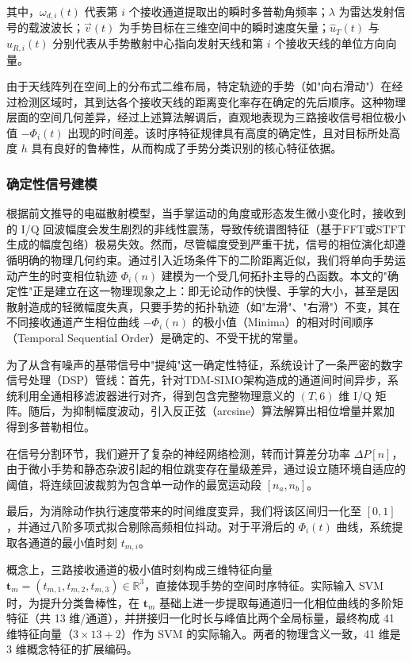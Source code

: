 其中，$\omega_{d,i}(t)$ 代表第 $i$ 个接收通道提取出的瞬时多普勒角频率；$\lambda$ 为雷达发射信号的载波波长；$\vec{v}(t)$ 为手势目标在三维空间中的瞬时速度矢量；$\hat{u}_{T}(t)$ 与 $\hat{u}_{R,i}(t)$ 分别代表从手势散射中心指向发射天线和第 $i$ 个接收天线的单位方向向量。

由于天线阵列在空间上的分布式二维布局，特定轨迹的手势（如"向右滑动"）在经过检测区域时，其到达各个接收天线的距离变化率存在确定的先后顺序。这种物理层面的空间几何差异，经过上述算法解调后，直观地表现为三路接收信号相位极小值 $-\Phi_{i}(t)$ 出现的时间差。该时序特征规律具有高度的确定性，且对目标所处高度 $h$ 具有良好的鲁棒性，从而构成了手势分类识别的核心特征依据。

\subsubsection{确定性信号建模}

根据前文推导的电磁散射模型，当手掌运动的角度或形态发生微小变化时，接收到的 I/Q 回波幅度会发生剧烈的非线性震荡，导致传统谱图特征（基于FFT或STFT生成的幅度包络）极易失效。然而，尽管幅度受到严重干扰，信号的相位演化却遵循明确的物理几何约束。通过引入近场条件下的二阶距离近似，我们将单向手势运动产生的时变相位轨迹 $\Phi_{i}(n)$ 建模为一个受几何拓扑主导的凸函数。本文的"确定性"正是建立在这一物理现象之上：即无论动作的快慢、手掌的大小，甚至是因散射造成的轻微幅度失真，只要手势的拓扑轨迹（如"左滑"、"右滑"）不变，其在不同接收通道产生相位曲线 $-\Phi_{i}(n)$ 的极小值（Minima）的相对时间顺序（Temporal Sequential Order）是确定的、不受干扰的常量\cite{lien2016soli}。

为了从含有噪声的基带信号中"提纯"这一确定性特征，系统设计了一条严密的数字信号处理（DSP）管线：首先，针对TDM-SIMO架构造成的通道间时间异步，系统利用全通相移滤波器进行对齐，得到包含完整物理意义的 $(T, 6)$ 维 I/Q 矩阵。随后，为抑制幅度波动，引入反正弦（arcsine）算法解算出相位增量并累加得到多普勒相位。

在信号分割环节，我们避开了复杂的神经网络检测，转而计算差分功率 $\Delta P[n]$，由于微小手势和静态杂波引起的相位跳变存在量级差异，通过设立随环境自适应的阈值，将连续回波裁剪为包含单一动作的最宽运动段 $[n_{a}, n_{b}]$。

最后，为消除动作执行速度带来的时间维度变异，我们将该区间归一化至 $[0, 1]$，并通过八阶多项式拟合剔除高频相位抖动。对于平滑后的 $\Phi_{i}(t)$ 曲线，系统提取各通道的最小值时刻 $t_{m,i}$。

概念上，三路接收通道的极小值时刻构成三维特征向量 $\boldsymbol{t}_{m} = (t_{m,1}, t_{m,2}, t_{m,3}) \in \mathbb{R}^{3}$，直接体现手势的空间时序特征。实际输入 SVM 时，为提升分类鲁棒性，在 $\boldsymbol{t}_{m}$ 基础上进一步提取每通道归一化相位曲线的多阶矩特征（共 13 维/通道），并拼接归一化时长与峰值比两个全局标量，最终构成 41 维特征向量（$3 \times 13 + 2$）作为 SVM 的实际输入。两者的物理含义一致，41 维是 3 维概念特征的扩展编码。

